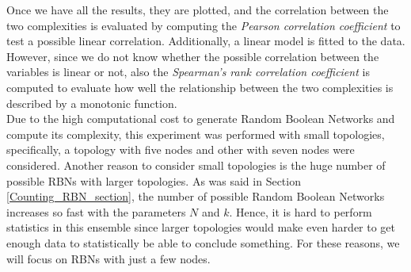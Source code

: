 Once we have all the results, they are plotted, and the correlation between the two complexities is evaluated by computing the \textit{Pearson correlation coefficient} to test a possible linear correlation. Additionally, a linear model is fitted to the data. However, since we do not know whether the possible correlation between the variables is linear or not, also the \textit{Spearman's rank correlation coefficient} is computed to evaluate how well the relationship between the two complexities is described by a monotonic function.\\

Due to the high computational cost to generate Random Boolean Networks and compute its complexity, this experiment was performed with small topologies, specifically, a topology with five nodes and other with seven nodes were considered. Another reason to consider small topologies is the huge number of possible RBNs with larger topologies. As was said in Section \ref{Counting_RBN_section}, the number of possible Random Boolean Networks increases so fast with the parameters $N$ and $k$. Hence, it is hard to perform statistics in this ensemble since larger topologies would make even harder to get enough data to statistically be able to conclude something. For these reasons, we will focus on RBNs with just a few nodes.\\





